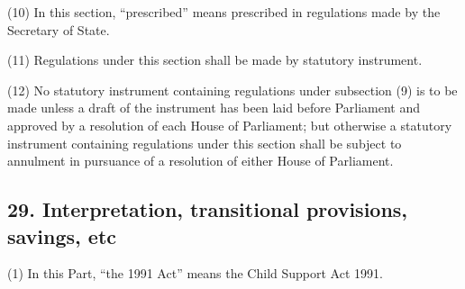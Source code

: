 \documentclass[12pt,a4paper]{article}
\begin{document}
(10) In this section, “prescribed” means prescribed in regulations made by the Secretary of State.

(11) Regulations under this section shall be made by statutory instrument.

(12) No statutory instrument containing regulations under subsection (9)  is to be made unless a draft of the instrument has been laid before Parliament and approved by a resolution of each House of Parliament; but otherwise a statutory instrument containing regulations under this section shall be subject to annulment in pursuance of a resolution of either House of Parliament.


%
%
%
%
%
%
%
%
%
%
%
%

\subsection{29. Interpretation, transitional provisions, savings, etc}

(1) In this Part, “the 1991 Act” means the Child Support Act 1991. 
\end{document}
